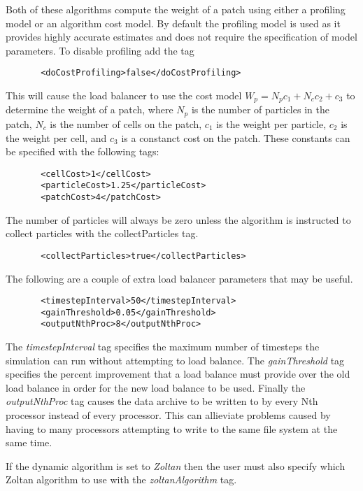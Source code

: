 Both of these algorithms compute the weight of a patch using either a profiling model 
or an algorithm cost model.  By default  the profiling model is used as it provides 
highly accurate estimates and does not require the specification of model parameters.  
To disable profiling add the tag

\begin{Verbatim}
       <doCostProfiling>false</doCostProfiling>
\end{Verbatim}

This will cause the load balancer to use the cost model $W_p=N_pc_1+N_cc_2+c_3$ to 
determine the weight of a patch, where $N_p$ is the number of particles 
in the patch, $N_c$ is the number of cells on the patch, $c_1$ is the weight per
particle, $c_2$ is the weight per cell, and $c_3$ is a constanct cost on the
patch.  These constants can be specified with the following tags:

\begin{Verbatim}
       <cellCost>1</cellCost>
       <particleCost>1.25</particleCost>
       <patchCost>4</patchCost>
\end{Verbatim}

The number of particles will always be zero unless the algorithm is instructed to
collect particles with the collectParticles tag.  

\begin{Verbatim}
       <collectParticles>true</collectParticles>
\end{Verbatim}

The following are a couple of extra load balancer parameters that may be useful.
\begin{Verbatim}
       <timestepInterval>50</timestepInterval>
       <gainThreshold>0.05</gainThreshold>
       <outputNthProc>8</outputNthProc>
\end{Verbatim}

The \emph{timestepInterval} tag specifies the maximum number of timesteps the simulation
can run without attempting to load balance.  The \emph{gainThreshold} tag specifies the 
percent improvement that a load balance must provide over the old load balance in 
order for the new load balance to be used.  Finally the \emph{outputNthProc} tag causes
the data archive to be written to by every Nth processor instead of every processor.  
This can allieviate problems caused by having to many processors attempting to write 
to the same file system at the same time. 

If the dynamic algorithm is set to \emph{Zoltan} then the user must also specify which
Zoltan algorithm to use with the \emph{zoltanAlgorithm} tag.  

